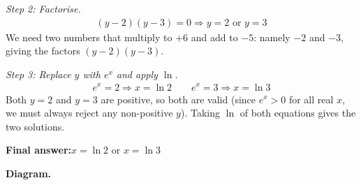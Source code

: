 \documentclass[11pt]{article}
\begin{document}
\textit{Step 2: Factorise.}
\[\begin{gathered}
(y-2)(y-3) = 0 \Rightarrow y = 2 \text{ or } y = 3
\end{gathered}\]
We need two numbers that multiply to \( +6 \) and add to \( -5 \): namely \( -2 \) and \( -3 \), giving the factors \( (y-2)(y-3) \).

\textit{Step 3: Replace \( y \) with \( e^x \) and apply \( \ln \).}
\[\begin{gathered}
e^x = 2 \Rightarrow x = \ln 2 \qquad e^x = 3 \Rightarrow x = \ln 3
\end{gathered}\]
Both \( y = 2 \) and \( y = 3 \) are positive, so both are valid (since \( e^x > 0 \) for all real \( x \), we must always reject any non-positive \( y \)). Taking \( \ln \) of both equations gives the two solutions.

\begin{answerbox}
\textbf{Final answer:}\quad \(\displaystyle  x = \ln 2 \) or \(\displaystyle  x = \ln 3 \)
\end{answerbox}
\textbf{Diagram.}
\end{document}
